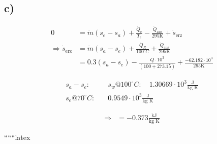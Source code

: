 

\subsection*{c)}
\begin{align*}
0 &= \dot{m} (s_e - s_a) + \frac{\dot{Q}_e}{T_e} - \frac{\dot{Q}_\text{aus}}{295 \text{K}} + \dot{s}_\text{erz} \\
\Rightarrow \dot{s}_\text{erz} &= \dot{m} (s_a - s_e) + \frac{\dot{Q}_R}{100^\circ C} + \frac{\dot{Q}_\text{aus}}{295 \text{K}} \\
                               &= 0.3 (s_a - s_e) - \frac{Q \cdot 10^3}{(100 + 273.15)} + \frac{-62.182 \cdot 10^3}{295 \text{K}}
\end{align*}

\begin{align*}
s_a - s_e: & \quad s_w @ 100^\circ C: \quad 1.30669 \cdot 10^3 \frac{\text{J}}{\text{kg K}} \\
s_e @ 70^\circ C: & \quad 0.9549 \cdot 10^3 \frac{\text{J}}{\text{kg K}}
\end{align*}

\begin{align*}
\Rightarrow &= -0.373 \frac{\text{kJ}}{\text{kg K}}
\end{align*}

``````latex